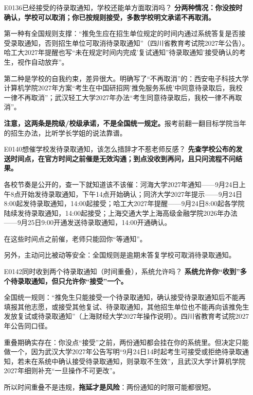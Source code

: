 \begin{qa}{E0136}{已经接受的待录取通知，学校还能单方面取消吗？}
\textbf{分两种情况：你没按时确认，学校可以取消；你已按规则接受，多数学校明文承诺不再取消。}

第一种有全国规则支撑：“推免生应在招生单位规定的时间内通过系统答复是否接受录取通知，否则招生单位可取消待录取通知”（四川省教育考试院2027年公告）。哈工大2027年提醒也写“未在规定时间内完成'复试通知''待录取通知'接受确认的考生，视作自动放弃”。

第二种是学校的自我约束，差异很大。明确写了“不再取消”的：西安电子科技大学计算机学院2027年方案“考生在中国研招网'推免服务系统'中同意待录取后，我校一律不再取消”；武汉轻工大学2027年办法“考生同意待录取后，我校一律不再取消”。

\textbf{注意，这两条是院级/校级承诺，不是全国统一规定。}报考前翻一翻目标学院当年的招生办法，比听学长学姐的说法靠谱。
\end{qa}

\begin{qa}{E0140}{想催学校发待录取通知，该怎么措辞才不惹老师反感？}
\textbf{先查学校公布的发送时间点，在官方时间之前催是无效沟通；到点没收到再问，且只问流程不问结果。}

各校节奏是公开的，查一下就知道该不该催：河海大学2027年通知——9月24日上午8点开始发待录取通知，下午14点开始确认；同济大学2027年提示——9月24日8:00起发待录取通知，14:00起接受；哈工大2027年提醒——9月24日8:00起各学院陆续发待录取通知，14:00起接受；上海交通大学上海高级金融学院2026年办法——9月25日9:00开通发送待录取通知，14:00开通确认。

在这些时间点之前催，老师只能回你“等通知”。

另外，主动问比被动等安全：全国规则是逾期未答复学校可取消待录取通知。
\end{qa}

\begin{qa}{E0142}{同时收到两个待录取通知（时间重叠），系统允许吗？}
\textbf{系统允许你“收到”多个待录取通知，但只允许你“接受”一个。}

全国统一规则：“推免生只能接受一个待录取通知，确认接受待录取通知后不能再填报其他志愿，或接受其他复试、待录取通知，其他招生单位也不能再向该推免生发放复试或待录取通知”（上海财经大学2027年操作说明）。四川省教育考试院2027年公告同口径。

重叠期确实存在：你没点“接受”之前，两份通知都会挂在你的系统里。但决定只能做一个，因为武汉大学2027年公告写明“9月24日14时起考生可接受或拒绝待录取通知，若未在系统中确认接受待录取通知，则录取不生效”，且武汉大学计算机学院2027年细则补充“一旦操作不可更改”。

所以时间重叠不是违规，\textbf{拖延才是风险}：两份通知的时限可能都很短。
\end{qa}

